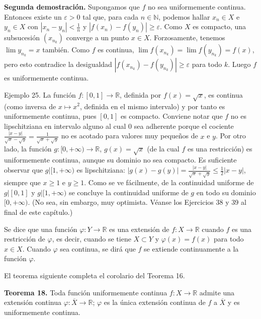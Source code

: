 \documentclass[12pt,oneside]{book}
\begin{document}
\textbf{Segunda demostración.} Supongamos que \(f\) no sea uniformemente continua. Entonces existe un \(\varepsilon > 0\) tal que, para cada \(n \in \mathbb{N}\), podemos hallar \(x_n \in X\) e \(y_n \in X\) con \(|x_n - y_n| < \frac{1}{n}\) y \(|f(x_n) - f(y_n)| \geq \varepsilon\). Como \(X\) es compacto, una subsucesión \((x_{n_k})\) converge a un punto \(x \in X\). Forzosamente, tenemos \(\lim y_{n_k} = x\) también. Como \(f\) es continua, \(\lim f(x_{n_k}) = \lim f(y_{n_k}) = f(x)\), pero esto contradice la desigualdad \(|f(x_{n_k}) - f(y_{n_k})| \geq \varepsilon\) para todo \(k\). Luego \(f\) es uniformemente continua.

Ejemplo 25. La función \(f: [0, 1] \to \mathbb{R}\), definida por \(f(x) = \sqrt{x}\), es continua (como inversa de \(x \mapsto x^2\), definida en el mismo intervalo) y por tanto es uniformemente continua, pues \([0, 1]\) es compacto. Conviene notar que \(f\) no es lipschitziana en intervalo alguno al cual \(0\) sea adherente porque el cociente \(\frac{|x - y|}{\sqrt{x} - \sqrt{y}} = \frac{1}{\sqrt{x} + \sqrt{y}}\) no es acotado para valores muy pequeños de \(x\) e \(y\). Por otro lado, la función \(g: [0, +\infty) \to \mathbb{R}\), \(g(x) = \sqrt{x}\) (de la cual \(f\) es una restricción) es uniformemente continua, aunque su dominio no sea compacto. Es suficiente observar que \(g|[1, +\infty)\) es lipschitziana: \(|g(x) - g(y)| = \frac{|x - y|}{\sqrt{x} + \sqrt{y}} \leq \frac{1}{2}|x - y|\), siempre que \(x \geq 1\) e \(y \geq 1\). Como se ve fácilmente, de la continuidad uniforme de \(g|[0, 1]\) y \(g|[1, +\infty)\) se concluye la continuidad uniforme de \(g\) en todo su dominio \([0, +\infty)\). (No sea, sin embargo, muy optimista. Véanse los Ejercicios 38 y 39 al final de este capítulo.)

Se dice que una función \(\varphi: Y \to \mathbb{R}\) es una extensión de \(f: X \to \mathbb{R}\) cuando \(f\) es una restricción de \(\varphi\), es decir, cuando se tiene \(X \subset Y\) y \(\varphi(x) = f(x)\) para todo \(x \in X\). Cuando \(\varphi\) sea continua, se dirá que \(f\) se extiende continuamente a la función \(\varphi\).

El teorema siguiente completa el corolario del Teorema 16.

\textbf{Teorema 18.} Toda función uniformemente continua \(f: X \to \mathbb{R}\) admite una extensión continua \(\varphi: \overline{X} \to \mathbb{R}\); \(\varphi\) es la única extensión continua de \(f\) a \(\overline{X}\) y es uniformemente continua.
\end{document}
